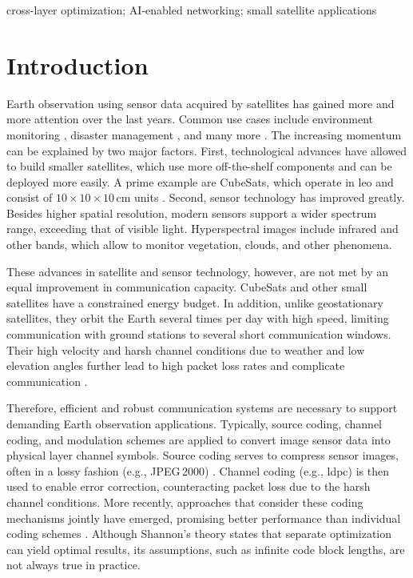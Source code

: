 \documentclass[conference]{IEEEtran}
\newcommand\jpegtwok{JPEG\,2000\xspace}
\begin{document}
\begin{IEEEkeywords}
  cross-layer optimization; AI-enabled networking; small satellite applications
  \end{IEEEkeywords}

\acresetall
\section{Introduction}

Earth observation using sensor data acquired by satellites has gained more and more attention over the last years.
Common use cases include environment monitoring \cite{rs14030589}, disaster management \cite{barmpoutis2020}, and many more \cite{radix,MarCO}.
The increasing momentum can be explained by two major factors.
First, technological advances have allowed to build smaller satellites, which use more off-the-shelf components and can be deployed more easily.
A prime example are CubeSats, which operate in \ac{leo} and consist of $10 \times 10 \times 10$\,cm units \cite{cubesat2020}.
Second, sensor technology has improved greatly.
Besides higher spatial resolution, modern sensors support a wider spectrum range, exceeding that of visible light.
Hyperspectral images include infrared and other bands, which allow to monitor vegetation, clouds, and other phenomena. %

These advances in satellite and sensor technology, however, are not met by an equal improvement in communication capacity.
CubeSats and other small satellites have a constrained energy budget. %
In addition, unlike geostationary satellites, they orbit the Earth several times per day with high speed, limiting communication with ground stations to several short communication windows.
Their high velocity and harsh channel conditions due to weather and low elevation angles further lead to high packet loss rates and complicate communication \cite{nogales2018}.

Therefore, efficient and robust communication systems are necessary to support demanding Earth observation applications.
Typically, source coding, channel coding, and modulation schemes are applied to convert image sensor data into physical layer channel symbols.
Source coding serves to compress sensor images, often in a lossy fashion (e.g., \jpegtwok) \cite{sentinel-2-user-handbook}.
Channel coding (e.g., \ac{ldpc}) is then used to enable error correction, counteracting packet loss due to the harsh channel conditions.
More recently, approaches that consider these coding mechanisms jointly have emerged, promising better performance than individual coding schemes \cite{6408177}.
Although Shannon's theory \cite{cover1991elements} states that separate optimization can yield optimal results, its assumptions, such as infinite code block lengths, are not always true in practice.
\end{document}
